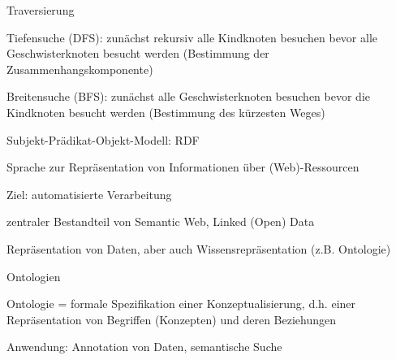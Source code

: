 \documentclass[a4paper]{article}
\begin{document}
\begin{multicols}{3}
\begin{itemize*}
\begin{itemize*}
\begin{itemize*}
        \end{itemize*}
        \item Traversierung
        \begin{itemize*}
            \item Tiefensuche (DFS): zunächst rekursiv alle Kindknoten besuchen bevor alle Geschwisterknoten besucht werden (Bestimmung der Zusammenhangskomponente)
            \item Breitensuche (BFS): zunächst alle Geschwisterknoten besuchen bevor die Kindknoten besucht werden (Bestimmung des kürzesten Weges)
        \end{itemize*}
    \end{itemize*}

    Subjekt-Prädikat-Objekt-Modell: RDF
    \begin{itemize*}
        \item Sprache zur Repräsentation von Informationen über (Web)-Ressourcen
        \item Ziel: automatisierte Verarbeitung
        \item zentraler Bestandteil von Semantic Web, Linked (Open) Data
        \item Repräsentation von Daten, aber auch Wissensrepräsentation (z.B. Ontologie)
    \end{itemize*}

    Ontologien
    \begin{itemize*}
        \item Ontologie = formale Spezifikation einer Konzeptualisierung, d.h. einer Repräsentation von Begriffen (Konzepten) und deren Beziehungen
        \item Anwendung: Annotation von Daten, semantische Suche
    \end{itemize*}


\end{itemize*}
\end{multicols}
\end{document}
